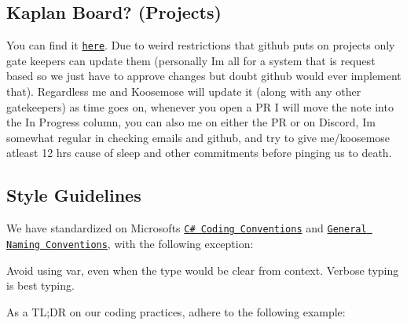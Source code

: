 \subsection*{Kaplan Board? (Projects)}

You can find it \href{https://github.com/OrderOfThePorcupine/ProjectPorcupine/projects/1}{\tt here}. Due to weird restrictions that github puts on projects only gate keepers can update them (personally I\textquotesingle{}m all for a system that is request based so we just have to approve changes but doubt github would ever implement that). Regardless me and Koosemose will update it (along with any other gatekeepers) as time goes on, whenever you open a PR I will move the note into the {\ttfamily In Progress} column, you can also  me on either the PR or on Discord, I\textquotesingle{}m somewhat regular in checking emails and github, and try to give me/koosemose atleast 12 hrs cause of sleep and other commitments before pinging us to death.

\subsection*{Style Guidelines}

We have standardized on Microsoft\textquotesingle{}s \href{https://msdn.microsoft.com/en-us/library/ff926074.aspx}{\tt C\# Coding Conventions} and \href{https://msdn.microsoft.com/en-us/library/ms229045(v=vs.110).aspx}{\tt General Naming Conventions}, with the following exception\+:


\begin{DoxyItemize}
\item Avoid using \textquotesingle{}var\textquotesingle{}, even when the type would be clear from context. Verbose typing is best typing.
\end{DoxyItemize}

As a TL;DR on our coding practices, adhere to the following example\+:


